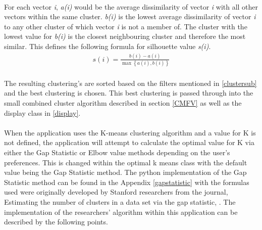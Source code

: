 \paragraph{}For each vector \textit{i}, \textit{a(i)} would be the average dissimilarity of vector \textit{i} with all other vectors within the same cluster. \textit{b(i)} is the lowest average dissimilarity of vector \textit{i} to any other cluster of which vector \textit{i} is not a member of. The cluster with the lowest value for \textit{b(i)} is the closest neighbouring cluster and therefore the most similar. This defines the following formula for silhouette value \textit{s(i)}.\linebreak
\begin{align*}
s\left( i \right) = \frac{{b\left( i \right) - a\left( i \right)}}{{\max \left\{ {a\left( i \right),b\left( i \right)} \right\}}}
\end{align*}

\paragraph{}The resulting clustering’s are sorted based on the filters mentioned in \ref{clustersub} and the best clustering is chosen. This best clustering is passed through into the small combined cluster algorithm described in section \ref{CMFV} as well as the display class in \ref{display}.

\paragraph{}When the application uses the K-means clustering algorithm and a value for K is not defined, the application will attempt to calculate the optimal value for K via either the Gap Statistic or Elbow value methods depending on the user’s preferences. This is changed within the optimal k means class with the default value being the Gap Statistic method. The python implementation of the Gap Statistic method can be found in the Appendix \ref{gapstatistic} with the formulas used were originally developed by Stanford researchers from the journal, Estimating the number of clusters in a data set via the gap statistic, \cite{gapref}. The implementation of the researchers’ algorithm within this application can be described by the following points.

